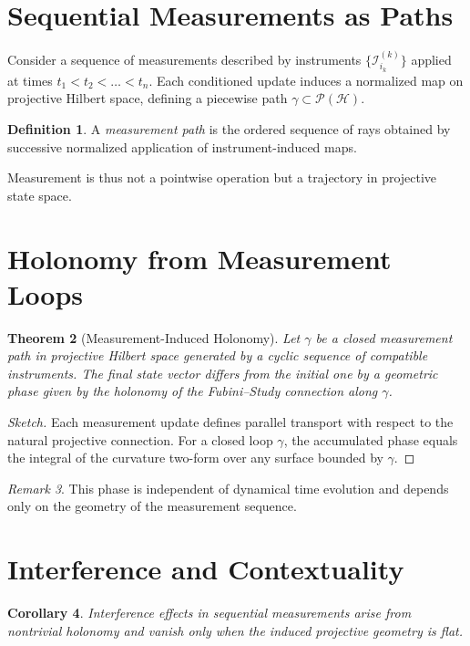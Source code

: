 \documentclass[12pt]{book}
\theoremstyle{plain}
\newtheorem{theorem}{Theorem}[chapter]
\newtheorem{corollary}[theorem]{Corollary}
\theoremstyle{definition}
\newtheorem{definition}[theorem]{Definition}
\theoremstyle{remark}
\newtheorem{remark}[theorem]{Remark}
\begin{document}
\section{Sequential Measurements as Paths}

Consider a sequence of measurements described by instruments
$\{\mathcal{I}_{i_k}^{(k)}\}$ applied at times
$t_1 < t_2 < \dots < t_n$.
Each conditioned update induces a normalized map on projective Hilbert
space, defining a piecewise path
$\gamma \subset \mathcal{P}(\mathcal{H})$.

\begin{definition}
A \emph{measurement path} is the ordered sequence of rays obtained by
successive normalized application of instrument-induced maps.
\end{definition}

Measurement is thus not a pointwise operation but a trajectory in
projective state space.

\section{Holonomy from Measurement Loops}

\begin{theorem}[Measurement-Induced Holonomy]
Let $\gamma$ be a closed measurement path in projective Hilbert space
generated by a cyclic sequence of compatible instruments.
The final state vector differs from the initial one by a geometric phase
given by the holonomy of the Fubini--Study connection along $\gamma$.
\end{theorem}

\begin{proof}[Sketch]
Each measurement update defines parallel transport with respect to the
natural projective connection.
For a closed loop $\gamma$, the accumulated phase equals the integral of
the curvature two-form over any surface bounded by $\gamma$.
\end{proof}

\begin{remark}
This phase is independent of dynamical time evolution and depends only on
the geometry of the measurement sequence.
\end{remark}

\section{Interference and Contextuality}

\begin{corollary}
Interference effects in sequential measurements arise from nontrivial
holonomy and vanish only when the induced projective geometry is flat.
\end{corollary}
\end{document}
